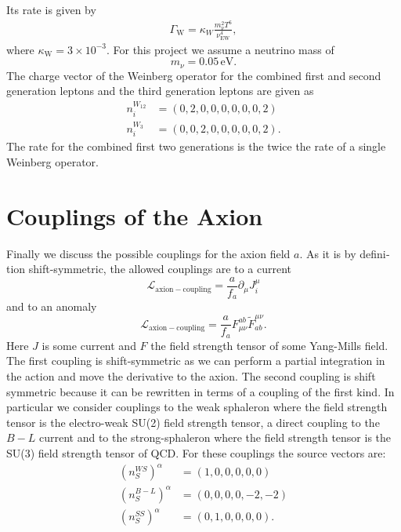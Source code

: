 \documentclass[master,       %
               twoside,        %
               BCOR10mm,       %
               english,ngerman, %
               ]{GAUBM}
\begin{document}
\begin{otherlanguage}{english}
Its rate is given by
\begin{align}
	\Gamma_\mathrm{W} = \kappa_W\frac{m_\nu^2 T^6}{\nu_\mathrm{EW}^4},
\end{align}
where $\kappa_\mathrm{W} = 3 \times 10^{-3}$.
For this project we assume a neutrino mass of
\begin{equation}
	m_\nu = 0.05 \, \mathrm{eV}.
\end{equation}
The charge vector of the Weinberg operator for the combined first and second generation leptons and the third generation leptons are given as
\begin{align}
	n^{W_{12}}_i &= (0,2,0,0,0,0,0,0,2) \nonumber \\
	n^{W_{3}}_i &= (0,0,2,0,0,0,0,0,2).
\end{align}
The rate for the combined first two generations is the twice the rate of a single Weinberg operator.

\section{Couplings of the Axion}
Finally we discuss the possible couplings for the axion field $a$. As it is by definition shift-symmetric, the allowed couplings are to a current
\begin{equation}
	\mathcal{L}_\mathrm{axion-coupling} = \frac{a}{f_a} \partial_\mu J^\mu_i
\end{equation}
and to an anomaly
\begin{equation}
	\mathcal{L}_\mathrm{axion-coupling} = \frac{a}{f_a} F_{\mu \nu}^{ab} \tilde{F}_{ab}^{\mu \nu}.
\end{equation}
Here $J$ is some current and $F$ the field strength tensor of some Yang-Mills field.
The first coupling is shift-symmetric as we can perform a partial integration in the action and move the derivative to the axion.
The second coupling is shift symmetric because it can be rewritten in terms of a coupling of the first kind.
In particular we consider couplings to the weak sphaleron where the field strength tensor is the electro-weak SU(2) field strength tensor,
a direct coupling to the $B - L$ current and to the strong-sphaleron where the field strength tensor is the SU(3) field strength tensor of QCD.
For these couplings the source vectors are:
\begin{align}
    (n_S^{WS} )^\alpha &= (1, 0, 0, 0, 0, 0)\nonumber \\
	(n_S^{B-L})^\alpha &= (0, 0, 0, 0, -2, -2) \nonumber \\
	(n_S^{SS} )^\alpha &= (0, 1, 0, 0, 0, 0).
\end{align}



\end{otherlanguage}
\end{document}
